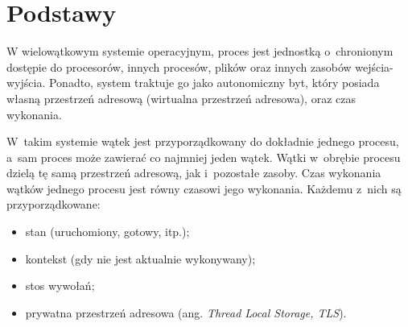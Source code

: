 \section{Podstawy}
%
%
\indent
	W wielowątkowym systemie operacyjnym, proces jest jednostką o~chronionym dostępie do 
	procesorów, innych procesów, plików oraz innych zasobów wejścia-wyjścia. Ponadto, system
	traktuje go jako autonomiczny byt, który posiada własną przestrzeń adresową (wirtualna 
	przestrzeń adresowa), oraz czas wykonania.
\par
%
\indent
	W~takim systemie wątek jest przyporządkowany do dokładnie jednego procesu, a~sam proces 
	może zawierać co najmniej jeden wątek. Wątki w~obrębie procesu dzielą tę samą przestrzeń
	adresową, jak i~pozostałe zasoby. Czas wykonania wątków jednego procesu jest równy czasowi
	jego wykonania. Każdemu z~nich są przyporządkowane:
	\begin{itemize}
	\item stan (uruchomiony, gotowy, itp.);
	\item kontekst (gdy nie jest aktualnie wykonywany);
	\item stos wywołań;
	\item prywatna przestrzeń adresowa (ang. \emph{Thread Local Storage, TLS}).
	\end{itemize}
\par
